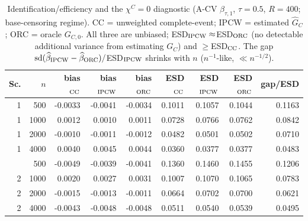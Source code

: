 \begin{table}[t]\centering\small
\caption{Identification/efficiency and the $\chi^C=0$ diagnostic (A-CV $\beta_{\tau,1}$, $\tau=0.5$, $R=400$; base-censoring regime). CC = unweighted complete-event; IPCW = estimated $\widehat G_C$; ORC = oracle $G_{C,0}$. All three are unbiased; ESD$_{\rm IPCW}\approx$ESD$_{\rm ORC}$ (no detectable additional variance from estimating $G_C$) and $\ge$ESD$_{\rm CC}$. The gap $\mathrm{sd}(\widehat\beta_{\rm IPCW}-\widehat\beta_{\rm ORC})/$ESD$_{\rm IPCW}$ shrinks with $n$ ($n^{-1}$-like, $\ll n^{-1/2}$).}
\label{tab:compare}\begin{tabular}{rr rrr rrr r}\toprule
Sc.&$n$&bias$_{\rm CC}$&bias$_{\rm IPCW}$&bias$_{\rm ORC}$&ESD$_{\rm CC}$&ESD$_{\rm IPCW}$&ESD$_{\rm ORC}$&gap/ESD\\\midrule
1 & 500 & -0.0033 & -0.0041 & -0.0034 & 0.1011 & 0.1057 & 0.1044 & 0.1163 \\
1 & 1000 & 0.0012 & 0.0010 & 0.0011 & 0.0728 & 0.0766 & 0.0762 & 0.0842 \\
1 & 2000 & -0.0010 & -0.0011 & -0.0012 & 0.0482 & 0.0501 & 0.0502 & 0.0710 \\
1 & 4000 & 0.0040 & 0.0045 & 0.0044 & 0.0360 & 0.0377 & 0.0377 & 0.0483 \\
\addlinespace
2 & 500 & -0.0049 & -0.0039 & -0.0041 & 0.1360 & 0.1460 & 0.1455 & 0.1206 \\
2 & 1000 & 0.0020 & 0.0027 & 0.0031 & 0.1007 & 0.1070 & 0.1065 & 0.0783 \\
2 & 2000 & -0.0015 & -0.0013 & -0.0011 & 0.0664 & 0.0702 & 0.0700 & 0.0621 \\
2 & 4000 & -0.0043 & -0.0048 & -0.0048 & 0.0511 & 0.0540 & 0.0539 & 0.0495 \\
\bottomrule\end{tabular}\end{table}
